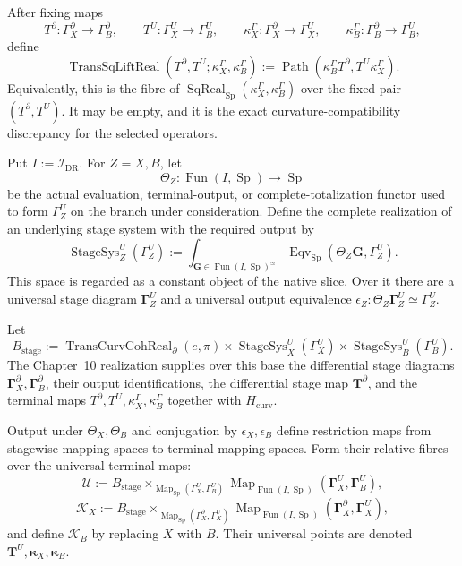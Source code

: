 \begin{definition}
\label{def:prequantum-fixed-transgression-square-lift-realization}
After fixing maps
\[
T^\partial:\Gamma_X^\partial\to\Gamma_B^\partial,\qquad
T^U:\Gamma_X^U\to\Gamma_B^U,\qquad
\kappa_X^\Gamma:\Gamma_X^\partial\to\Gamma_X^U,\qquad
\kappa_B^\Gamma:\Gamma_B^\partial\to\Gamma_B^U,
\]
define
\[
\boxed{
\operatorname{TransSqLiftReal}
(T^\partial,T^U;\kappa_X^\Gamma,\kappa_B^\Gamma)
:=
\operatorname{Path}
\left(\kappa_B^\Gamma T^\partial,
      T^U\kappa_X^\Gamma\right).
}
\]
Equivalently, this is the fibre of
$\operatorname{SqReal}_{\operatorname{Sp}}
(\kappa_X^\Gamma,\kappa_B^\Gamma)$ over the fixed pair
$(T^\partial,T^U)$.  It may be empty, and it is the exact curvature-compatibility
discrepancy for the selected operators.
\end{definition}

Put $I:=\mathcal I_{\mathrm{DR}}$.  For $Z=X,B$, let
\[
\Theta_Z:\operatorname{Fun}(I,\operatorname{Sp})\longrightarrow
\operatorname{Sp}
\]
be the actual evaluation, terminal-output, or complete-totalization functor used
to form $\Gamma_Z^U$ on the branch under consideration.  Define the complete
realization of an underlying stage system with the required output by
\[
\boxed{
\operatorname{StageSys}_Z^U(\Gamma_Z^U)
:=
\int_{\mathbf G\in\operatorname{Fun}(I,\operatorname{Sp})^\simeq}
\operatorname{Eqv}_{\operatorname{Sp}}
(\Theta_Z\mathbf G,\Gamma_Z^U).
}
\]
This space is regarded as a constant object of the native slice.  Over it there
are a universal stage diagram $\mathbf\Gamma_Z^U$ and a universal output
equivalence $\epsilon_Z:\Theta_Z\mathbf\Gamma_Z^U\simeq\Gamma_Z^U$.

Let
\[
B_{\mathrm{stage}}
:=
\operatorname{TransCurvCohReal}_{\partial}(e,\pi)
\times\operatorname{StageSys}_X^U(\Gamma_X^U)
\times\operatorname{StageSys}_B^U(\Gamma_B^U).
\]
The Chapter~10 realization supplies over this base the differential stage
diagrams $\mathbf\Gamma_X^\partial,\mathbf\Gamma_B^\partial$, their output
identifications, the differential stage map $\mathbf T^\partial$, and the
terminal maps $T^\partial,T^U,\kappa_X^\Gamma,\kappa_B^\Gamma$ together with
$H_{\mathrm{curv}}$.

Output under $\Theta_X,\Theta_B$ and conjugation by $\epsilon_X,\epsilon_B$
define restriction maps from stagewise mapping spaces to terminal mapping
spaces.  Form their relative fibres over the universal terminal maps:
\[
\boxed{
\mathcal U
:=
B_{\mathrm{stage}}
\times_{\operatorname{Map}_{\operatorname{Sp}}
(\Gamma_X^U,\Gamma_B^U)}
\operatorname{Map}_{\operatorname{Fun}(I,\operatorname{Sp})}
(\mathbf\Gamma_X^U,\mathbf\Gamma_B^U),
}
\]
\[
\boxed{
\mathcal K_X
:=
B_{\mathrm{stage}}
\times_{\operatorname{Map}_{\operatorname{Sp}}
(\Gamma_X^\partial,\Gamma_X^U)}
\operatorname{Map}_{\operatorname{Fun}(I,\operatorname{Sp})}
(\mathbf\Gamma_X^\partial,\mathbf\Gamma_X^U),
}
\]
and define $\mathcal K_B$ by replacing $X$ with $B$.  Their universal points are
denoted $\mathbf T^U,\mathbf\kappa_X,\mathbf\kappa_B$.

